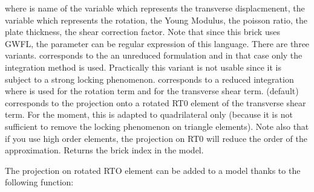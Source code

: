 \documentclass[a4paper,11pt,english]{sphinxmanual}
\begin{document}
\begin{sphinxVerbatim}[commandchars=\\\{\}]
 
     
       
\end{sphinxVerbatim}

where  is name of the variable which represents the transverse displacmenent,  the variable which represents the rotation,  the Young Modulus,  the poisson ratio,  the plate thickness,  the shear correction factor. Note that since this brick
uses GWFL, the parameter can be regular expression of this language.
There are three variants.
 corresponds to the an
unreduced formulation and in that case only the integration
method  is used. Practically this variant is not usable since
it is subject to a strong locking phenomenon.
 corresponds to a reduced integration where  is
used for the rotation term and  for the transverse
shear term.  (default) corresponds to the projection onto
a rotated RT0 element of the transverse shear term. For the moment, this
is adapted to quadrilateral only (because it is not sufficient to
remove the locking phenomenon on triangle elements). Note also that if
you use high order elements, the projection on RT0 will reduce the order
of the approximation.
Returns the brick index in the model.

The projection on rotated RTO element can be added to a model thanks to the following function:

\begin{sphinxVerbatim}[commandchars=\\\{\}]
  
\end{sphinxVerbatim}
\end{document}
